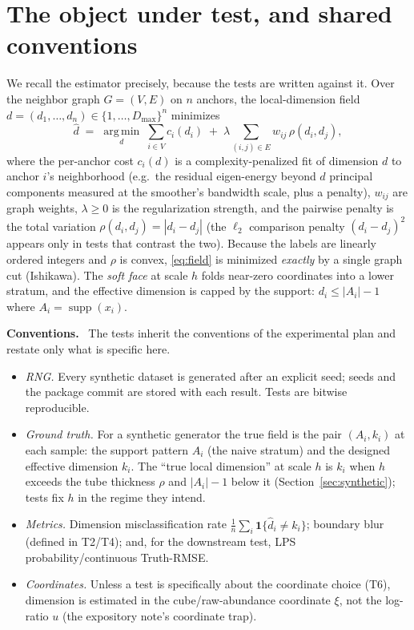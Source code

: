 \documentclass[11pt]{article}
\theoremstyle{definition}
\newcommand{\supp}{\operatorname{supp}}
\newcommand{\argmin}{\operatorname*{arg\,min}}
\newcommand{\field}[1]{\smallskip\noindent\textbf{\textsf{#1.}}\ }
\begin{document}
\section{The object under test, and shared conventions}\label{sec:object}

We recall the estimator precisely, because the tests are written against it. Over
the neighbor graph $G=(V,E)$ on $n$ anchors, the local-dimension field
$d=(d_1,\dots,d_n)\in\{1,\dots,D_{\max}\}^n$ minimizes
\begin{equation}\label{eq:field}
  \widehat d \;=\; \argmin_{d}\;
  \sum_{i\in V} c_i(d_i)\;+\;\lambda\!\!\sum_{(i,j)\in E}\!\! w_{ij}\,\rho(d_i,d_j),
\end{equation}
where the per-anchor cost $c_i(d)$ is a complexity-penalized fit of dimension $d$
to anchor $i$'s neighborhood (e.g.\ the residual eigen-energy beyond $d$ principal
components measured at the smoother's bandwidth scale, plus a penalty), $w_{ij}$
are graph weights, $\lambda\ge 0$ is the regularization strength, and the pairwise
penalty is the total variation $\rho(d_i,d_j)=|d_i-d_j|$ (the $\ell_2$ comparison
penalty $(d_i-d_j)^2$ appears only in tests that contrast the two). Because the
labels are linearly ordered integers and $\rho$ is convex, \eqref{eq:field} is
minimized \emph{exactly} by a single graph cut (Ishikawa). The \emph{soft face} at
scale $h$ folds near-zero coordinates into a lower stratum, and the effective
dimension is capped by the support: $d_i\le |A_i|-1$ where $A_i=\supp(x_i)$.

\field{Conventions} The tests inherit the conventions of the experimental plan and
restate only what is specific here.
\begin{itemize}[leftmargin=1.4em,nosep]
\item \emph{RNG.} Every synthetic dataset is generated after an explicit seed;
seeds and the package commit are stored with each result. Tests are bitwise
reproducible.
\item \emph{Ground truth.} For a synthetic generator the true field is the pair
$(A_i,k_i)$ at each sample: the support pattern $A_i$ (the naive stratum) and the
designed effective dimension $k_i$. The ``true local dimension'' at scale $h$ is
$k_i$ when $h$ exceeds the tube thickness $\rho$ and $|A_i|-1$ below it
(Section~\ref{sec:synthetic}); tests fix $h$ in the regime they intend.
\item \emph{Metrics.} Dimension misclassification rate $\frac1n\sum_i\mathbf 1\{\widehat
d_i\neq k_i\}$; boundary blur (defined in T2/T4); and, for the downstream test,
LPS probability/continuous Truth-RMSE.
\item \emph{Coordinates.} Unless a test is specifically about the coordinate
choice (T6), dimension is estimated in the cube/raw-abundance coordinate $\xi$, not
the log-ratio $u$ (the expository note's coordinate trap).
\end{itemize}
\end{document}
